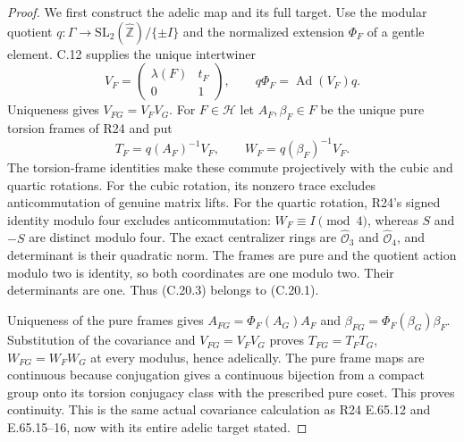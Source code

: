 \begin{proof}
We first construct the adelic map and its full target.
Use the modular quotient
$q:\Gamma\to\mathrm{SL}_2(\widehat{\mathbb Z})/\{\pm I\}$
and the normalized extension $\Phi_F$ of a gentle element.
C.12 supplies the unique intertwiner
\[
 V_F=\begin{pmatrix}\lambda(F)&t_F\\0&1\end{pmatrix},
 \qquad q\Phi_F=\operatorname{Ad}(V_F)q.
\]
Uniqueness gives $V_{FG}=V_FV_G$. For $F\in\mathcal H$
let $A_F,\beta_F\in F$ be the unique pure torsion frames
of R24 and put
\[
       T_F=q(A_F)^{-1}V_F,\qquad
       W_F=q(\beta_F)^{-1}V_F.
 \tag{C.20.3}
\]
The torsion-frame identities make these commute
projectively with the cubic and quartic rotations.
For the cubic rotation, its nonzero trace excludes
anticommutation of genuine matrix lifts. For the
quartic rotation, R24's signed identity modulo four
excludes anticommutation: $W_F\equiv I\pmod4$,
whereas $S$ and $-S$ are distinct modulo four.
The exact centralizer rings are
$\widehat{\mathcal O}_3$ and
$\widehat{\mathcal O}_4$, and determinant is their
quadratic norm. The frames are pure and the quotient
action modulo two is identity, so both coordinates
are one modulo two. Their determinants are one.
Thus (C.20.3) belongs to (C.20.1).

Uniqueness of the pure frames gives
$A_{FG}=\Phi_F(A_G)A_F$ and
$\beta_{FG}=\Phi_F(\beta_G)\beta_F$.
Substitution of the covariance and $V_{FG}=V_FV_G$
proves $T_{FG}=T_FT_G$, $W_{FG}=W_FW_G$
at every modulus, hence adelically. The pure frame
maps are continuous because conjugation gives a
continuous bijection from a compact group onto its
torsion conjugacy class with the prescribed pure
coset. This proves continuity. This is the same
actual covariance calculation as R24 E.65.12 and
E.65.15--16, now with its entire adelic target stated.


\end{proof}
